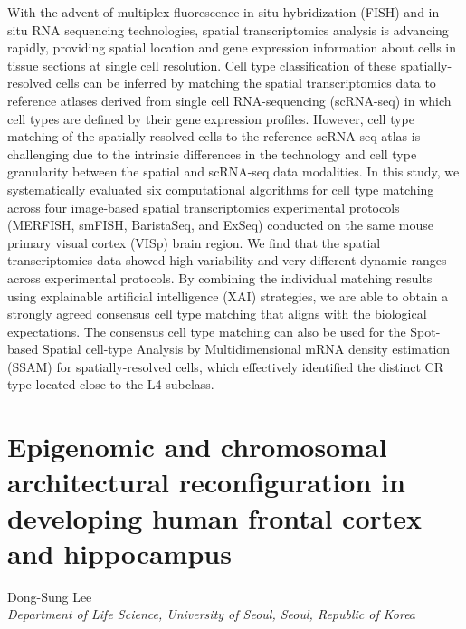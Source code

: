 \noindent
With the advent of multiplex fluorescence in situ hybridization (FISH) and in situ RNA sequencing technologies, spatial transcriptomics analysis is advancing rapidly, providing spatial location and gene expression information about cells in tissue sections at single cell resolution. Cell type classification of these spatially-resolved cells can be inferred by matching the spatial transcriptomics data to reference atlases derived from single cell RNA-sequencing (scRNA-seq) in which cell types are defined by their gene expression profiles. However, cell type matching of the spatially-resolved cells to the reference scRNA-seq atlas is challenging due to the intrinsic differences in the technology and cell type granularity between the spatial and scRNA-seq data modalities. In this study, we systematically evaluated six computational algorithms for cell type matching across four image-based spatial transcriptomics experimental protocols (MERFISH, smFISH, BaristaSeq, and ExSeq) conducted on the same mouse primary visual cortex (VISp) brain region. We find that the spatial transcriptomics data showed high variability and very different dynamic ranges across experimental protocols. By combining the individual matching results using explainable artificial intelligence (XAI) strategies, we are able to obtain a strongly agreed consensus cell type matching that aligns with the biological expectations. The consensus cell type matching can also be used for the Spot-based Spatial cell-type Analysis by Multidimensional mRNA density estimation (SSAM) for spatially-resolved cells, which effectively identified the distinct CR type located close to the L4 subclass.
\newpage

\section*{Epigenomic and chromosomal architectural reconfiguration in developing human frontal cortex and hippocampus}

\begin{center}
Dong-Sung Lee \\
\vspace{0.2cm}
\textit{Department of Life Science, University of Seoul, Seoul, Republic of Korea} \\
\end{center}

